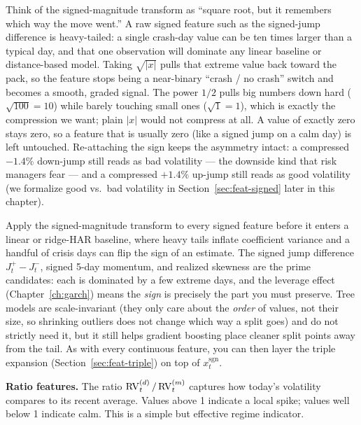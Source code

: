\begin{intuition}
Think of the signed-magnitude transform as ``square root, but it remembers which way the move went.'' A raw signed feature such as the signed-jump difference is heavy-tailed: a single crash-day value can be ten times larger than a typical day, and that one observation will dominate any linear baseline or distance-based model. Taking $\sqrt{|x|}$ pulls that extreme value back toward the pack, so the feature stops being a near-binary ``crash / no crash'' switch and becomes a smooth, graded signal. The power $1/2$ pulls big numbers down hard ($\sqrt{100}=10$) while barely touching small ones ($\sqrt{1}=1$), which is exactly the compression we want; plain $|x|$ would not compress at all. A value of exactly zero stays zero, so a feature that is usually zero (like a signed jump on a calm day) is left untouched. Re-attaching the sign keeps the asymmetry intact: a compressed $-1.4\%$ down-jump still reads as bad volatility --- the downside kind that risk managers fear --- and a compressed $+1.4\%$ up-jump still reads as good volatility (we formalize good vs.\ bad volatility in Section~\ref{sec:feat-signed} later in this chapter).
\end{intuition}

\begin{projectconnection}
Apply the signed-magnitude transform to every signed feature before it enters a linear or ridge-HAR baseline, where heavy tails inflate coefficient variance and a handful of crisis days can flip the sign of an estimate. The signed jump difference $J_t^+ - J_t^-$, signed 5-day momentum, and realized skewness are the prime candidates: each is dominated by a few extreme days, and the leverage effect (Chapter~\ref{ch:garch}) means the \emph{sign} is precisely the part you must preserve. Tree models are scale-invariant (they only care about the \emph{order} of values, not their size, so shrinking outliers does not change which way a split goes) and do not strictly need it, but it still helps gradient boosting place cleaner split points away from the tail. As with every continuous feature, you can then layer the triple expansion (Section~\ref{sec:feat-triple}) on top of $x_t^{\text{sgn}}$.
\end{projectconnection}

\textbf{Ratio features.} The ratio $\operatorname{RV}_t^{(d)} / \operatorname{RV}_t^{(m)}$ captures how today's volatility compares to its recent average.
Values above 1 indicate a local spike; values well below 1 indicate calm.
This is a simple but effective regime indicator.

